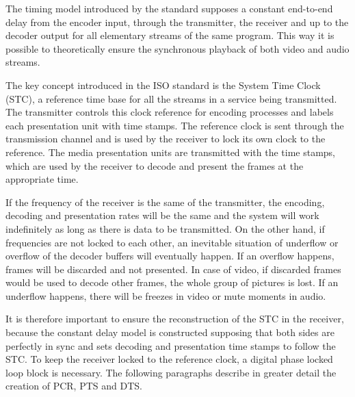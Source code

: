 \documentclass[
	12pt,				%
	openright,			%
	twoside,			%
	a4paper,			%
	brazil,
	french,				%
	english
	]{abntex2}
\begin{document}
The timing model introduced by the standard supposes a constant end-to-end delay from the encoder input, through the transmitter, the receiver and up to the decoder output for all elementary streams of the same program. This way it is possible to theoretically ensure the synchronous playback of both video and audio streams.

The key concept introduced in the ISO standard is the System Time Clock (STC), a reference time base for all the streams in a service being transmitted. The transmitter controls this clock reference for encoding processes and labels each presentation unit with time stamps. The reference clock is sent through the transmission channel and is used by the receiver to lock its own clock to the reference. The media presentation units are transmitted with the time stamps, which are used by the receiver to decode and present the frames at the appropriate time.

If the frequency of the receiver is the same of the transmitter, the encoding, decoding and presentation rates will be the same and the system will work indefinitely as long as there is data to be transmitted. On the other hand, if frequencies are not locked to each other, an inevitable situation of underflow or overflow of the decoder buffers will eventually happen. If an overflow happens, frames will be discarded and not presented. In case of video, if discarded frames would be used to decode other frames, the whole group of pictures is lost. If an underflow happens, there will be freezes in video or mute moments in audio.

It is therefore important to ensure the reconstruction of the STC in the receiver, because the constant delay model is constructed supposing that both sides are perfectly in sync and sets decoding and presentation time stamps to follow the STC. To keep the receiver locked to the reference clock, a digital phase locked loop block is necessary. The following paragraphs describe in greater detail the creation of PCR, PTS and DTS.

\end{document}
